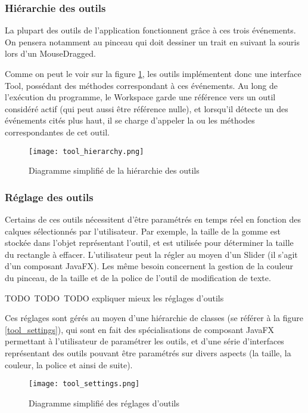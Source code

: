 \subsubsection{Hiérarchie des outils}
\par
La plupart des outils de l'application  fonctionnent grâce à ces trois événements. On pensera notamment au pinceau qui doit dessiner un trait en suivant la souris lors d'un MouseDragged. 
\par
Comme on peut le voir sur la figure \ref{fig:tool_hier}, les outils implémentent donc une interface Tool, possédant des méthodes correspondant à ces événements. Au long de l'exécution du programme, le Workspace garde une référence vers un outil considéré actif (qui peut aussi être référence nulle), et lorsqu'il détecte un des événements cités plus haut, il se charge d'appeler la ou les méthodes correspondantes de cet outil.
\par

\begin{figure}[h]
	\caption{Diagramme simplifié de la hiérarchie des outils}
	\centering
	\texttt{[image: tool\_hierarchy.png]}
	\label{fig:tool_hier}
\end{figure}

\subsubsection{Réglage des outils}
Certains de ces outils nécessitent d'être paramétrés en temps réel en fonction des calques sélectionnés par l'utilisateur. Par exemple, la taille de la gomme est stockée dans l'objet représentant l'outil, et est utilisée pour déterminer la taille du rectangle à effacer. L'utilisateur peut la régler au moyen d'un Slider (il s'agit d'un composant JavaFX). Les même besoin concernent la gestion de la couleur du pinceau, de la taille et de la police de l'outil de modification de texte.
\par
TODO TODO TODO expliquer mieux les réglages d'outils

Ces réglages sont gérés au moyen d'une hiérarchie de classes (se référer à la figure \ref{tool_settings}), qui sont en fait des spécialisations de composant JavaFX permettant à l'utilisateur de paramétrer les outils, et d'une série d'interfaces représentant des outils pouvant être paramétrés sur divers aspects (la taille, la couleur, la police et ainsi de suite).
\par


\begin{figure}[h]
	\caption{Diagramme simplifié des réglages d'outils}
	\centering
	\texttt{[image: tool\_settings.png]}
	\label{fig:tool_settings}
\end{figure}

